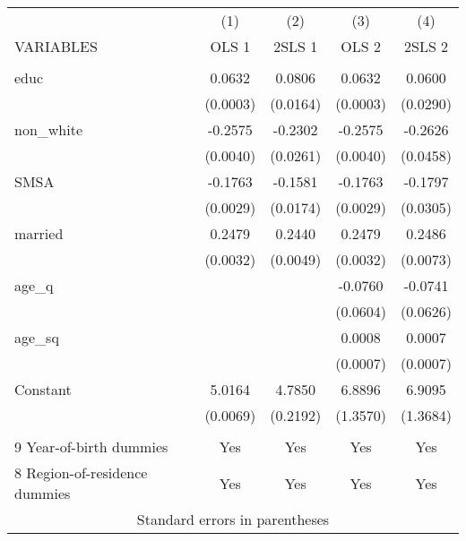 \documentclass[]{article}
\begin{document}
\begin{tabular}{lcccc} \hline
 & (1) & (2) & (3) & (4) \\
VARIABLES & OLS 1 & 2SLS 1 & OLS 2 & 2SLS 2 \\ \hline
 &  &  &  &  \\
educ & 0.0632 & 0.0806 & 0.0632 & 0.0600 \\
 & (0.0003) & (0.0164) & (0.0003) & (0.0290) \\
non\_white & -0.2575 & -0.2302 & -0.2575 & -0.2626 \\
 & (0.0040) & (0.0261) & (0.0040) & (0.0458) \\
SMSA & -0.1763 & -0.1581 & -0.1763 & -0.1797 \\
 & (0.0029) & (0.0174) & (0.0029) & (0.0305) \\
married & 0.2479 & 0.2440 & 0.2479 & 0.2486 \\
 & (0.0032) & (0.0049) & (0.0032) & (0.0073) \\
age\_q &  &  & -0.0760 & -0.0741 \\
 &  &  & (0.0604) & (0.0626) \\
age\_sq &  &  & 0.0008 & 0.0007 \\
 &  &  & (0.0007) & (0.0007) \\
Constant & 5.0164 & 4.7850 & 6.8896 & 6.9095 \\
 & (0.0069) & (0.2192) & (1.3570) & (1.3684) \\
 &  &  &  &  \\
9 Year-of-birth dummies & Yes & Yes & Yes & Yes \\
 8 Region-of-residence dummies & Yes & Yes & Yes & Yes \\ \hline
\multicolumn{5}{c}{ Standard errors in parentheses} \\
\end{tabular}
\end{document}
